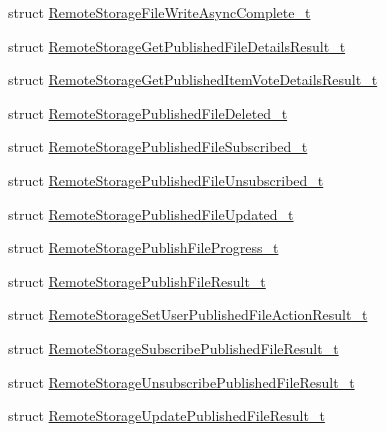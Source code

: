 \begin{DoxyCompactItemize}
\item 
struct \hyperlink{struct_valve_1_1_steamworks_1_1_remote_storage_file_write_async_complete__t}{Remote\+Storage\+File\+Write\+Async\+Complete\+\_\+t}
\item 
struct \hyperlink{struct_valve_1_1_steamworks_1_1_remote_storage_get_published_file_details_result__t}{Remote\+Storage\+Get\+Published\+File\+Details\+Result\+\_\+t}
\item 
struct \hyperlink{struct_valve_1_1_steamworks_1_1_remote_storage_get_published_item_vote_details_result__t}{Remote\+Storage\+Get\+Published\+Item\+Vote\+Details\+Result\+\_\+t}
\item 
struct \hyperlink{struct_valve_1_1_steamworks_1_1_remote_storage_published_file_deleted__t}{Remote\+Storage\+Published\+File\+Deleted\+\_\+t}
\item 
struct \hyperlink{struct_valve_1_1_steamworks_1_1_remote_storage_published_file_subscribed__t}{Remote\+Storage\+Published\+File\+Subscribed\+\_\+t}
\item 
struct \hyperlink{struct_valve_1_1_steamworks_1_1_remote_storage_published_file_unsubscribed__t}{Remote\+Storage\+Published\+File\+Unsubscribed\+\_\+t}
\item 
struct \hyperlink{struct_valve_1_1_steamworks_1_1_remote_storage_published_file_updated__t}{Remote\+Storage\+Published\+File\+Updated\+\_\+t}
\item 
struct \hyperlink{struct_valve_1_1_steamworks_1_1_remote_storage_publish_file_progress__t}{Remote\+Storage\+Publish\+File\+Progress\+\_\+t}
\item 
struct \hyperlink{struct_valve_1_1_steamworks_1_1_remote_storage_publish_file_result__t}{Remote\+Storage\+Publish\+File\+Result\+\_\+t}
\item 
struct \hyperlink{struct_valve_1_1_steamworks_1_1_remote_storage_set_user_published_file_action_result__t}{Remote\+Storage\+Set\+User\+Published\+File\+Action\+Result\+\_\+t}
\item 
struct \hyperlink{struct_valve_1_1_steamworks_1_1_remote_storage_subscribe_published_file_result__t}{Remote\+Storage\+Subscribe\+Published\+File\+Result\+\_\+t}
\item 
struct \hyperlink{struct_valve_1_1_steamworks_1_1_remote_storage_unsubscribe_published_file_result__t}{Remote\+Storage\+Unsubscribe\+Published\+File\+Result\+\_\+t}
\item 
struct \hyperlink{struct_valve_1_1_steamworks_1_1_remote_storage_update_published_file_result__t}{Remote\+Storage\+Update\+Published\+File\+Result\+\_\+t}

\end{DoxyCompactItemize}
